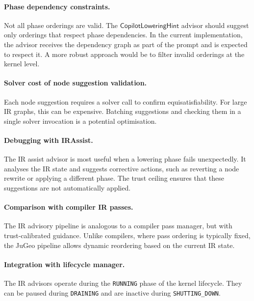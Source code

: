 \documentclass[11pt]{article}
\newcommand{\LowHint}{\mathsf{CopilotLoweringHint}}
\begin{document}
\paragraph{Phase dependency constraints.}
Not all phase orderings are valid.  The $\LowHint$ advisor
should suggest only orderings that respect phase dependencies.
In the current implementation, the advisor receives the
dependency graph as part of the prompt and is expected to
respect it.  A more robust approach would be to filter
invalid orderings at the kernel level.

\paragraph{Solver cost of node suggestion validation.}
Each node suggestion requires a solver call to confirm
equisatisfiability.  For large IR graphs, this can be
expensive.  Batching suggestions and checking them in a
single solver invocation is a potential optimisation.

\paragraph{Debugging with IRAssist.}
The IR assist advisor is most useful when a lowering phase
fails unexpectedly.  It analyses the IR state and suggests
corrective actions, such as reverting a node rewrite or
applying a different phase.  The trust ceiling ensures that
these suggestions are not automatically applied.

\paragraph{Comparison with compiler IR passes.}
The IR advisory pipeline is analogous to a compiler pass
manager, but with trust-calibrated guidance.  Unlike
compilers, where pass ordering is typically fixed, the
JuGeo pipeline allows dynamic reordering based on the
current IR state.

\paragraph{Integration with lifecycle manager.}
The IR advisors operate during the \texttt{RUNNING} phase
of the kernel lifecycle.  They can be paused during
\texttt{DRAINING} and are inactive during
\texttt{SHUTTING\_DOWN}.

\end{document}
